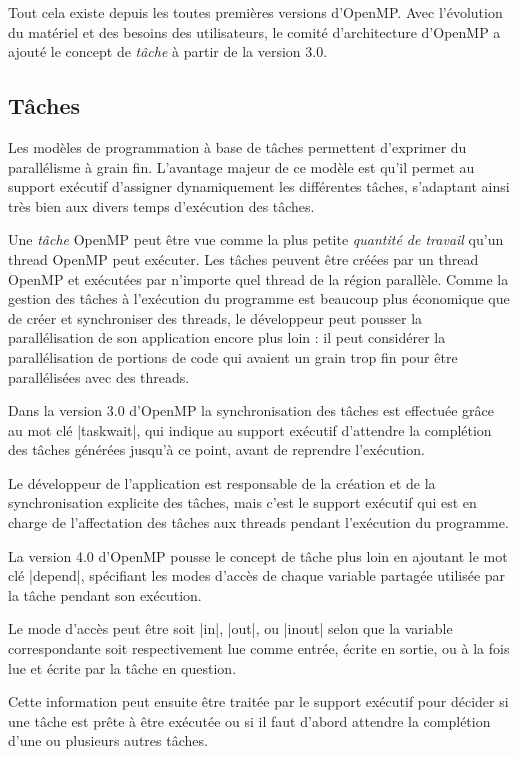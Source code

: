 Tout cela existe depuis les toutes premières versions d'OpenMP.
Avec l'évolution du matériel et des besoins des utilisateurs, le comité d'architecture d'OpenMP a ajouté le concept de \emph{tâche} à partir de la version 3.0.



\subsection{Tâches}

Les modèles de programmation à base de tâches permettent d'exprimer du parallélisme à grain fin. L'avantage majeur de ce modèle est qu'il permet au support exécutif d'assigner dynamiquement les différentes tâches, s'adaptant ainsi très bien aux divers temps d'exécution des tâches.

Une \emph{tâche} OpenMP peut être vue comme la plus petite \emph{quantité de travail} qu'un thread OpenMP peut exécuter.
Les tâches peuvent être créées par un thread OpenMP et exécutées par n'importe quel thread de la région parallèle.
Comme la gestion des tâches à l'exécution du programme est beaucoup plus économique que de créer et synchroniser des threads, le développeur peut pousser la parallélisation de son application encore plus loin : il peut considérer la parallélisation de portions de code qui avaient un grain trop fin pour être parallélisées avec des threads.

Dans la version 3.0 d'OpenMP la synchronisation des tâches est effectuée grâce au mot clé |taskwait|, qui indique au support exécutif d'attendre la complétion des tâches générées jusqu'à ce point, avant de reprendre l'exécution.

Le développeur de l'application est responsable de la création et de la synchronisation explicite des tâches, mais c'est le support exécutif qui est en charge de l'affectation des tâches aux threads pendant l'exécution du programme.

La version 4.0 d'OpenMP pousse le concept de tâche plus loin en ajoutant le mot clé |depend|, spécifiant les modes d'accès de chaque variable partagée utilisée par la tâche pendant son exécution.

Le mode d'accès peut être soit |in|, |out|, ou |inout| selon que la variable correspondante soit respectivement lue comme entrée, écrite en sortie, ou à la fois lue et écrite par la tâche en question.

Cette information peut ensuite être traitée par le support exécutif pour décider si une tâche est prête à être exécutée ou si il faut d'abord attendre la complétion d'une ou plusieurs autres tâches.


